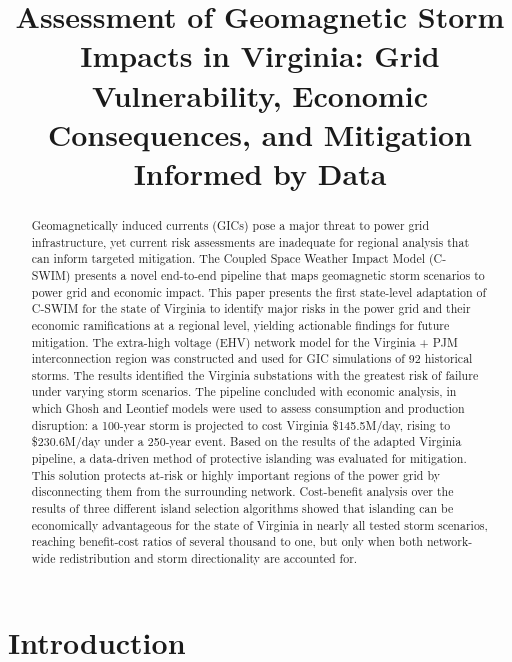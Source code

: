 \documentclass[draft]{agujournal2019}
\begin{document}
\title{Assessment of Geomagnetic Storm Impacts in Virginia: Grid Vulnerability, Economic Consequences, and Mitigation Informed by Data}


\begin{abstract}
Geomagnetically induced currents (GICs) pose a major threat to power grid infrastructure, yet current risk assessments
are inadequate for regional analysis that can inform targeted mitigation. The Coupled Space Weather Impact Model (C-
SWIM) presents a novel end-to-end pipeline that maps geomagnetic storm scenarios to power grid and economic
impact. This paper presents the first state-level adaptation of C-SWIM for the state of Virginia to identify major risks in
the power grid and their economic ramifications at a regional level, yielding actionable findings for future mitigation.
The extra-high voltage (EHV) network model for the Virginia + PJM interconnection region was constructed and used for
GIC simulations of 92 historical storms. The results identified the Virginia substations with the greatest risk of failure
under varying storm scenarios. The pipeline concluded with economic analysis, in which Ghosh and Leontief models
were used to assess consumption and production disruption: a 100-year storm is projected to cost Virginia
\$145.5M/day, rising to \$230.6M/day under a 250-year event. Based on the results of the adapted Virginia pipeline, a data-driven method of protective islanding was evaluated for mitigation. This solution protects at-risk or highly important regions of the power grid by disconnecting them from the surrounding network. Cost-benefit analysis over the results of three different island selection algorithms showed that islanding can be economically advantageous for the state of Virginia in nearly all tested storm scenarios, reaching benefit-cost ratios of several thousand to one, but only when both network-wide redistribution and storm directionality are accounted for. 
\end{abstract}
\clearpage
\section{Introduction}
\end{document}
